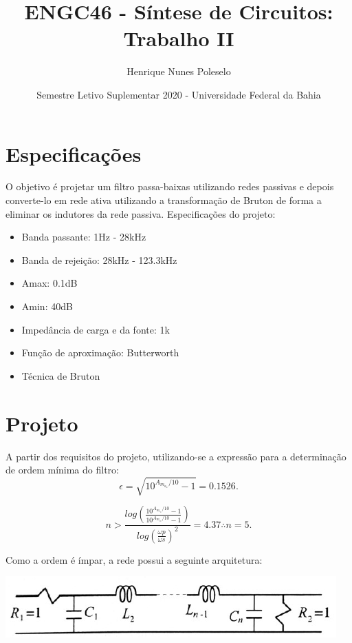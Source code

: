 \documentclass{article}
\title{ENGC46 - Síntese de Circuitos: Trabalho II}
\date{Semestre Letivo Suplementar 2020 - Universidade Federal da Bahia}
\author{Henrique Nunes Poleselo}
\begin{document}
\maketitle

\section{Especificações}
O objetivo é projetar um filtro passa-baixas utilizando redes passivas e depois converte-lo em rede ativa utilizando a transformação de Bruton de forma a eliminar os indutores da rede passiva. Especificações do projeto:
\begin{itemize} 
    \item Banda passante: 1Hz - 28kHz
    \item Banda de rejeição: 28kHz - 123.3kHz
    \item Amax: 0.1dB
    \item Amin: 40dB
    \item Impedância de carga e da fonte: 1k
    \item Função de aproximação: Butterworth
    \item Técnica de Bruton
\end{itemize}


\section{Projeto}
A partir dos requisitos do projeto, utilizando-se a expressão para a determinação de ordem mínima do filtro:
\begin{equation}
     \epsilon = \sqrt{10^{A_m_a_x/10}-1} = 0.1526.
\end{equation}

\begin{equation}
     n > \frac{log(\frac{10^{A_m_i_n/10}-1}{10^{A_m_i_n/10}-1})}{log(\frac{\omega p}{\omega s})^2} = 4.37 \therefore n = 5.
\end{equation}

Como a ordem é ímpar, a rede possui a seguinte arquitetura:

\begin{center}
\centering
  \includegraphics[scale=0.8]{img/arquiteturaDaRede.png}
\end{center}
\end{document}
